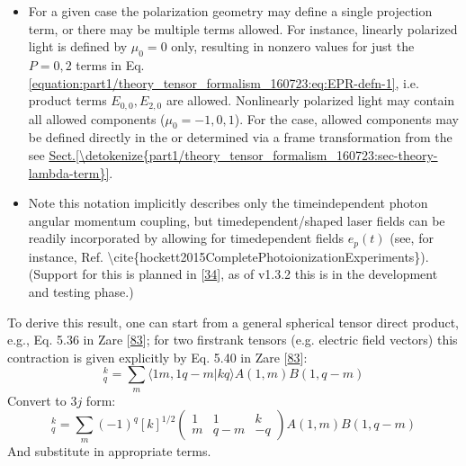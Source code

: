 \documentclass[letterpaper,table,10pt,english]{jupyterBook}
\begin{document}
\begin{itemize}
\item {} 
\sphinxAtStartPar
For a given case the polarization geometry may define a single projection term, or there may be multiple terms allowed. For instance, linearly polarized light is defined by \(\mu_0=0\) only, resulting in non\sphinxhyphen{}zero values for just the \(P=0,2\) terms in Eq. \eqref{equation:part1/theory_tensor_formalism_160723:eq:EPR-defn-1}, i.e. product terms \(E_{0,0}, E_{2,0}\) are allowed. Non\sphinxhyphen{}linearly polarized light may contain all allowed components (\(\mu_0=-1,0,1\)). For the {\hyperref[\detokenize{backmatter/glossary:term-MF}]{}} case, allowed components may be defined directly in the {\hyperref[\detokenize{backmatter/glossary:term-MF}]{}} or determined via a frame transformation from the {\hyperref[\detokenize{backmatter/glossary:term-LF}]{}} \sphinxhyphen{} see \hyperref[\detokenize{part1/theory_tensor_formalism_160723:sec-theory-lambda-term}]{Sect.\@ \ref{\detokenize{part1/theory_tensor_formalism_160723:sec-theory-lambda-term}}}.

\item {} 
\sphinxAtStartPar
Note this notation implicitly describes only the time\sphinxhyphen{}independent photon angular momentum coupling, but time\sphinxhyphen{}dependent/shaped laser fields can be readily incorporated by allowing for time\sphinxhyphen{}dependent fields \(e_{p}(t)\) (see, for instance, Ref. \textbackslash{}cite\{hockett2015CompletePhotoionizationExperiments\}). (Support for this is planned in  {[}\hyperlink{cite.backmatter/bibliography:id606}{34}{]}, as of v1.3.2 this is in the development and testing phase.)

\end{itemize}

\sphinxAtStartPar
To derive this result, one can start from a general spherical tensor direct product, e.g., Eq. 5.36 in Zare {[}\hyperlink{cite.backmatter/bibliography:id986}{83}{]}; for two first\sphinxhyphen{}rank tensors (e.g. electric field vectors) this contraction is given explicitly by Eq. 5.40 in Zare {[}\hyperlink{cite.backmatter/bibliography:id986}{83}{]}:
\label{equation:part1/theory_tensor_formalism_160723:e2d3f906-add5-4bcc-b40f-1f7ae22dd77b}\begin{equation}
[A^{(1)}\otimes B^{(1)}]_{q}^{k}=\sum_{m}\langle1m,1q-m|kq\rangle A(1,m)B(1,q-m)
\end{equation}
\sphinxAtStartPar
Convert to \(3j\) form:
\label{equation:part1/theory_tensor_formalism_160723:ece22d26-29dd-4e87-a619-f54a988040a7}\begin{equation}
[A^{(1)}\otimes B^{(1)}]_{q}^{k}=\sum_{m}(-1)^{q}[k]^{1/2}\left(\begin{array}{ccc}
1 & 1 & k\\
m & q-m & -q
\end{array}\right)A(1,m)B(1,q-m)
\end{equation}
\sphinxAtStartPar
And substitute in appropriate terms.
\end{document}

